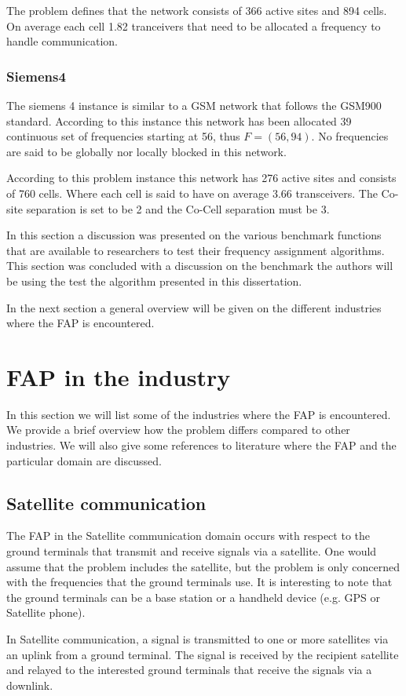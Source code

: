 The problem defines that the network consists of 366 active sites and 894 cells. On average each cell 1.82 tranceivers that need to be allocated a frequency to handle communication.
\subsubsection{Siemens4}
The siemens 4 instance is similar to a GSM network that follows the GSM900 standard. According to this instance this network has been allocated 39 continuous set of frequencies starting at 56, thus $F = (56,94)$. No frequencies are said to be globally nor locally blocked in this network.

According to this problem instance this network has 276 active sites and consists of 760 cells. Where each cell is said to have on average 3.66 transceivers. The Co-site separation is set to be 2 and the Co-Cell separation must be 3.

In this section a discussion was presented on the various benchmark functions that are available to researchers to test their frequency assignment algorithms. This section was concluded with a discussion on the benchmark the authors will be using the test the algorithm presented in this dissertation.

In the next section a general overview will be given on the different industries where the FAP is encountered.
\section{FAP in the industry}
\label{sec:FAPIndustry}
In this section we will list some of the industries where the FAP is encountered. We provide a brief overview how the problem differs compared to other industries. We will also give some references to literature where the FAP and the particular domain are discussed. 

\subsection{Satellite communication}
The FAP in the Satellite communication domain occurs with respect to the ground terminals that transmit and receive signals via a satellite. One would assume that the problem includes the satellite, but the problem is only concerned with the frequencies that the ground terminals use. It is interesting to note that the ground terminals can be a base station or a handheld device (e.g. GPS or Satellite phone).

In Satellite communication, a signal is transmitted to one or more satellites via an uplink from a ground terminal. The signal is received by the recipient satellite and relayed to the interested ground terminals that receive the signals via a downlink.

